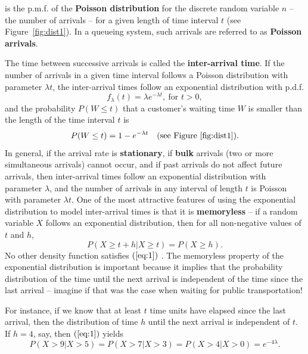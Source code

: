 is the p.m.f. of the \textbf{Poisson distribution} for the discrete random variable $n$ -- the number of arrivals -- for a given length of time interval $t$ (see Figure~\ref{fig:dist1}). In a queueing system, such arrivals are referred to as \textbf{Poisson arrivals}. \par The time between successive arrivals is called the \textbf{inter-arrival time}. If the number of arrivals in a given time interval follows a Poisson distribution with parameter $\lambda t$, the inter-arrival times follow an exponential distribution with p.d.f. 
$$ f_{\lambda}(t) = \lambda e^{-\lambda t}, \ \textrm{for }t>0,$$ and the probability $P(W\leq t)$ that a customer's waiting time $W$ is smaller than the length of the time interval $t$ is  
$$P(W\leq t) = 1 - e^{-\lambda t}\quad \textrm{(see Figure~\ref{fig:dist1})}.$$
In general, if the arrival rate is \textbf{stationary}, if \textbf{bulk} arrivals (two or more simultaneous arrivals) cannot occur, and if past arrivals do not affect future arrivals, then inter-arrival times follow an exponential distribution with parameter $\lambda$, and the number of arrivals in any interval of length $t$ is Poisson with parameter $\lambda t$. \newl One of the most attractive features of using the exponential distribution to model inter-arrival times is that it is \textbf{memoryless} --  if a random variable $X$ follows an exponential distribution, then for all non-negative values of $t$ and $h$,
\begin{equation}
P(X \geq t + h|X \geq t) = P(X \geq h). 
\label{eq:1}
\end{equation}
No other density function satisfies $(\ref{eq:1})$ \cite{QS_R}. The memoryless property of the exponential distribution is important because it implies that the probability distribution of the time until the next arrival is independent of the time since the last arrival -- imagine if that was the case when waiting for public transportation! \par For instance, if we know that at least $t$ time units have elapsed since the last arrival, then the distribution of time $h$ until the next arrival is independent of $t$. If $h=4$, say, then $(\ref{eq:1})$ yields 
$$ P(X>9|X>5)= P(X>7|X>3) = P(X>4|X>0) = e^{-4 \lambda}.$$

